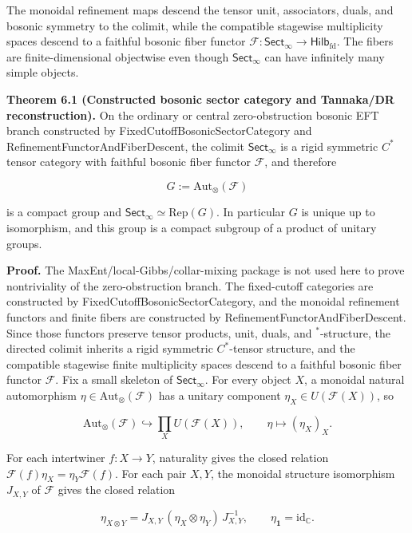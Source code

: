 The monoidal refinement maps descend the tensor unit, associators, duals, and bosonic symmetry to the colimit, while the compatible stagewise multiplicity spaces descend to a faithful bosonic fiber functor \(\mathcal F: \mathsf{Sect}_\infty \to \mathsf{Hilb}_{\mathrm{fd}}\). The fibers are finite-dimensional objectwise even though \(\mathsf{Sect}_\infty\) can have infinitely many simple objects.

\textbf{Theorem 6.1 (Constructed bosonic sector category and Tannaka/DR reconstruction).} On the ordinary or central zero-obstruction bosonic EFT branch constructed by FixedCutoffBosonicSectorCategory and RefinementFunctorAndFiberDescent, the colimit \(\mathsf{Sect}_\infty\) is a rigid symmetric \(C^*\) tensor category with faithful bosonic fiber functor \(\mathcal F\), and therefore

\[
G := \mathrm{Aut}_\otimes(\mathcal F)
\]

is a compact group and \(\mathsf{Sect}_\infty \simeq \mathrm{Rep}(G)\). In particular \(G\) is unique up to isomorphism, and this group is a compact subgroup of a product of unitary groups.

\textbf{Proof.} The MaxEnt/local-Gibbs/collar-mixing package is not used here to prove nontriviality of the zero-obstruction branch. The fixed-cutoff categories are constructed by FixedCutoffBosonicSectorCategory, and the monoidal refinement functors and finite fibers are constructed by RefinementFunctorAndFiberDescent. Since those functors preserve tensor products, unit, duals, and \(^*\)-structure, the directed colimit inherits a rigid symmetric \(C^*\)-tensor structure, and the compatible stagewise finite multiplicity spaces descend to a faithful bosonic fiber functor \(\mathcal F\). Fix a small skeleton of \(\mathsf{Sect}_\infty\). For every object \(X\), a monoidal natural automorphism \(\eta \in \mathrm{Aut}_\otimes(\mathcal F)\) has a unitary component \(\eta_X \in U(\mathcal F(X))\), so

\[
\mathrm{Aut}_\otimes(\mathcal F) \hookrightarrow \prod_X U(\mathcal F(X)), \qquad \eta \mapsto (\eta_X)_X.
\]

For each intertwiner \(f:X\to Y\), naturality gives the closed relation \(\mathcal F(f)\eta_X=\eta_Y\mathcal F(f)\). For each pair \(X,Y\), the monoidal structure isomorphism \(J_{X,Y}\) of \(\mathcal F\) gives the closed relation

\[
\eta_{X\otimes Y}=J_{X,Y}\,(\eta_X\otimes\eta_Y)\,J_{X,Y}^{-1},
\qquad
\eta_{\mathbf 1}=\mathrm{id}_{\mathbb C}.
\]

